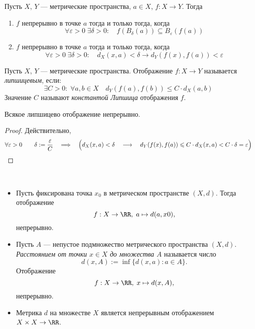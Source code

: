 \documentclass[12pt,a4paper]{article}
\begin{document}
    \begin{corollary}
        Пусть $X$, $Y$ --- метрические пространства, $a \in X$, $f: X \to Y$. Тогда
        \begin{enumerate}
            \item $f$ непрерывно в точке $a$ тогда и только тогда, когда
                \[\forall \varepsilon > 0\; \exists \delta > 0:\quad f(B_\delta(a)) \subseteq B_\varepsilon(f(a))\]
            \item $f$ непрерывно в точке $a$ тогда и только тогда, когда
                \[\forall \varepsilon > 0\; \exists \delta > 0:\quad d_X(x, a) < \delta \rightarrow d_Y(f(x), f(a)) < \varepsilon\]
        \end{enumerate}
    \end{corollary}

    \begin{definition}
        Пусть $X$, $Y$ --- метрические пространства. Отображение $f: X \to Y$ называется \emph{липшицевым}, если:
        \[\exists C > 0:\; \forall a, b \in X\quad d_Y(f(a), f(b)) \leqslant C \cdot d_X(a, b)\]
        Значение $C$ называют \emph{константой Липшица} отображения $f$.
    \end{definition}

    \begin{theorem}
        Всякое липшицево отображение непрерывно.
    \end{theorem}

    \begin{proof}
        Действительно,
        \[\forall \varepsilon > 0\qquad \delta := \frac{\varepsilon}{C}\quad \Longrightarrow\quad \Bigl(d_X(x, a) < \delta\quad \longrightarrow\quad d_Y(f(x), f(a)) \leqslant C \cdot d_X(x, a) < C \cdot \delta = \varepsilon \Bigr)\]
    \end{proof}

    \begin{example}\ 
        \begin{itemize}
            \item Пусть фиксирована точка $x_0$ в метрическом пространстве $(X, d)$. Тогда отображение
                \[f: X \to \RR,\; a \mapsto d(a, x0),\]
                непрерывно.
            \item Пусть $A$ --- непустое подмножество метрического пространства $(X, d)$. \emph{Расстоянием от точки $x \in X$ до множества $A$} называется число
                \[d(x, A) := \inf\{d(x, a): a \in A\}.\]
                Отображение
                \[f: X \to \RR,\; x \mapsto d(x, A),\]
                непрерывно.
            \item Метрика $d$ на множестве $X$ является непрерывным отображением $X \times X \to \RR$.
        \end{itemize}
    \end{example}
\end{document}
